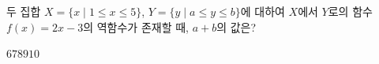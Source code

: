\hspace*{2mm}\begin{minipage}[t]{\dimexpr\linewidth-2mm\relax}\vspace{0pt}
두 집합 $X=\{x \mid 1\le x\le 5\}$, $Y=\{y \mid a\le y\le b\}$에 대하여 $X$에서 $Y$로의 함수 $f(x)=2x-3$의 역함수가 존재할 때, $a+b$의 값은? 
\begin{choices32}{$6$}{$7$}{$8$}{$9$}{$10$}\end{choices32}\end{minipage}

